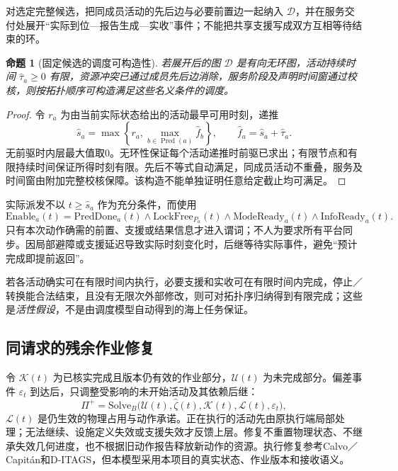 \documentclass[UTF8,fontset=fandol,a4paper,11pt]{ctexart}
\newtheorem{proposition}{命题}
\newcommand{\Pred}{\operatorname{Pred}}
\begin{document}
对选定完整候选，把同成员活动的先后边与必要前置边一起纳入 $\mathcal D$，并在服务交付处展开“实际到位—报告生成—实收”事件；不能把共享支援写成双方互相等待结束的环。

\begin{proposition}[固定候选的调度可构造性]
若展开后的图 $\mathcal D$ 是有向无环图，活动持续时间 $\widehat\tau_a\geq0$ 有限，资源冲突已通过成员先后边消除，服务阶段及声明时间窗通过校核，则按拓扑顺序可构造满足这些名义条件的调度。
\end{proposition}
\begin{proof}
令 $r_a$ 为由当前实际状态给出的活动最早可用时刻，递推
\begin{equation}
 \widehat s_a=\max\left\{r_a,
       \max_{b\in\Pred(a)}\widehat f_b\right\},\qquad
 \widehat f_a=\widehat s_a+\widehat\tau_a.
 \label{eq:earliest}
\end{equation}
无前驱时内层最大值取0。无环性保证每个活动递推时前驱已求出；有限节点和有限持续时间保证所得时刻有限。先后不等式自动满足，同成员活动不重叠，服务及时间窗由附加完整校核保障。该构造不能单独证明任意给定截止均可满足。
\end{proof}

实际派发不以 $t\geq\widehat s_a$ 作为充分条件，而使用
\begin{equation}
 \mathrm{Enable}_a(t)=\mathrm{PredDone}_a(t)\land
 \mathrm{LockFree}_{P_a}(t)\land\mathrm{ModeReady}_a(t)
 \land\mathrm{InfoReady}_a(t).
 \label{eq:dispatch}
\end{equation}
只有本次动作确需的前置、支援或结果信息才进入谓词；不人为要求所有平台同步。因局部避障或支援延迟导致实际时刻变化时，后继等待实际事件，避免“预计完成即提前返回”。

若各活动确实可在有限时间内执行，必要支援和实收可在有限时间内完成，停止／转换能合法结束，且没有无限次外部修改，则可对拓扑序归纳得到有限完成；这些是\emph{活性假设}，不是由调度模型自动得到的海上任务保证。

\subsection{同请求的残余作业修复}

令 $\mathcal K(t)$ 为已核实完成且版本仍有效的作业部分，$\mathcal U(t)$ 为未完成部分。偏差事件 $\varepsilon_t$ 到达后，只调整受影响的未开始活动及其依赖后继：
\begin{equation}
 \Pi^+=\mathrm{Solve}_{B}\bigl(\mathcal U(t),\widehat\zeta(t),
             \mathcal K(t),\mathcal L(t),\varepsilon_t\bigr),
 \label{eq:repair}
\end{equation}
$\mathcal L(t)$ 是仍生效的物理占用与动作承诺。正在执行的活动先由原执行端局部处理；无法继续、设施定义失效或支援失效才反馈上层。修复不重置物理状态、不继承失效几何进度，也不根据旧动作报告释放新动作的资源。执行修复参考Calvo／Capitán和D-ITAGS\cite{calvo,ditags}，但本模型采用本项目的真实状态、作业版本和接收语义。
\end{document}
